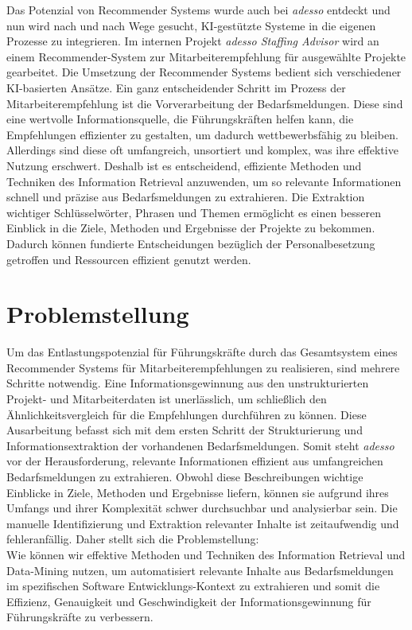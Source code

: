 \documentclass[a4paper,12pt]{scrreprt}
\newcommand{\hiddenchapter}[1]{
	\chapter*{{#1}}
}
\begin{document}
Das Potenzial von Recommender Systems wurde auch bei \emph{adesso} entdeckt und nun wird nach und nach Wege gesucht, KI-gestützte Systeme in die eigenen Prozesse zu integrieren. Im internen Projekt \emph{adesso Staffing Advisor} wird an einem Recommender-System zur Mitarbeiterempfehlung für ausgewählte Projekte gearbeitet. Die Umsetzung der Recommender Systems bedient sich verschiedener KI-basierten Ansätze. Ein ganz entscheidender Schritt im Prozess der Mitarbeiterempfehlung ist die Vorverarbeitung der Bedarfsmeldungen. Diese sind eine wertvolle Informationsquelle, die Führungskräften helfen kann, die Empfehlungen effizienter zu gestalten, um dadurch wettbewerbsfähig zu bleiben. Allerdings sind diese oft umfangreich, unsortiert und komplex, was ihre effektive Nutzung erschwert. Deshalb ist es entscheidend, effiziente Methoden und Techniken des Information Retrieval anzuwenden, um so relevante Informationen schnell und präzise aus Bedarfsmeldungen zu extrahieren. Die Extraktion wichtiger Schlüsselwörter, Phrasen und Themen ermöglicht es einen besseren Einblick in die Ziele, Methoden und Ergebnisse der Projekte zu bekommen. Dadurch können fundierte Entscheidungen bezüglich der Personalbesetzung getroffen und Ressourcen effizient genutzt werden.\\
\hiddenchapter{Problemstellung}
Um das Entlastungspotenzial für Führungskräfte durch das Gesamtsystem eines Recommender Systems für Mitarbeiterempfehlungen zu realisieren, sind mehrere Schritte notwendig. Eine Informationsgewinnung aus den unstrukturierten Projekt- und Mitarbeiterdaten ist unerlässlich, um schließlich den Ähnlichkeitsvergleich für die Empfehlungen durchführen zu können. Diese Ausarbeitung befasst sich mit dem ersten Schritt der Strukturierung und Informationsextraktion der vorhandenen Bedarfsmeldungen. Somit steht \emph{adesso} vor der Herausforderung, relevante Informationen effizient aus umfangreichen Bedarfsmeldungen zu extrahieren. Obwohl diese Beschreibungen wichtige Einblicke in Ziele, Methoden und Ergebnisse liefern, können sie aufgrund ihres Umfangs und ihrer Komplexität schwer durchsuchbar und analysierbar sein. Die manuelle Identifizierung und Extraktion relevanter Inhalte ist zeitaufwendig und fehleranfällig. Daher stellt sich die Problemstellung: \\

Wie können wir effektive Methoden und Techniken des Information Retrieval und Data-Mining nutzen, um automatisiert relevante Inhalte aus Bedarfsmeldungen im spezifischen Software Entwicklungs-Kontext zu extrahieren und somit die Effizienz, Genauigkeit und Geschwindigkeit der Informationsgewinnung für Führungskräfte zu verbessern.\\
\end{document}
